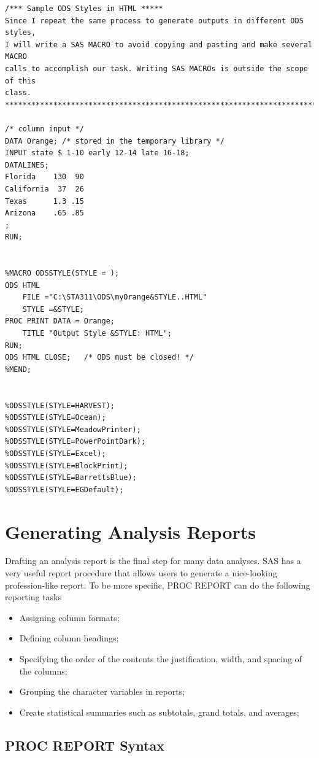 \documentclass[
]{book}
\begin{document}
\begin{verbatim}
/*** Sample ODS Styles in HTML *****
Since I repeat the same process to generate outputs in different ODS styles,
I will write a SAS MACRO to avoid copying and pasting and make several MACRO
calls to accomplish our task. Writing SAS MACROs is outside the scope of this
class.
*****************************************************************************/

/* column input */
DATA Orange; /* stored in the temporary library */
INPUT state $ 1-10 early 12-14 late 16-18;
DATALINES;
Florida    130  90
California  37  26
Texas      1.3 .15
Arizona    .65 .85
;
RUN;


%MACRO ODSSTYLE(STYLE = );
ODS HTML
    FILE ="C:\STA311\ODS\myOrange&STYLE..HTML"
    STYLE =&STYLE;
PROC PRINT DATA = Orange;
    TITLE "Output Style &STYLE: HTML";
RUN;
ODS HTML CLOSE;   /* ODS must be closed! */
%MEND; 


%ODSSTYLE(STYLE=HARVEST);
%ODSSTYLE(STYLE=Ocean);
%ODSSTYLE(STYLE=MeadowPrinter);
%ODSSTYLE(STYLE=PowerPointDark);
%ODSSTYLE(STYLE=Excel);
%ODSSTYLE(STYLE=BlockPrint);
%ODSSTYLE(STYLE=BarrettsBlue);
%ODSSTYLE(STYLE=EGDefault);
\end{verbatim}

\hypertarget{generating-analysis-reports}{%
\chapter{Generating Analysis Reports}\label{generating-analysis-reports}}

Drafting an analysis report is the final step for many data analyses. SAS has a very useful report procedure that allows users to generate a nice-looking profession-like report. To be more specific, PROC REPORT can do the following reporting tasks

\begin{itemize}
\item
  Assigning column formats;
\item
  Defining column headings;
\item
  Specifying the order of the contents the justification, width, and spacing of the columns;
\item
  Grouping the character variables in reports;
\item
  Create statistical summaries such as subtotals, grand totals, and averages;
\end{itemize}

\hypertarget{proc-report-syntax}{%
\section{PROC REPORT Syntax}\label{proc-report-syntax}}
\end{document}
